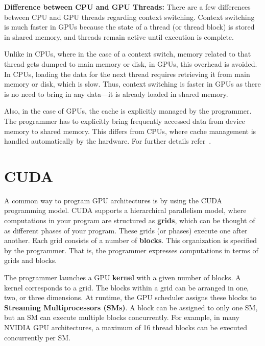 \documentclass[12pt]{book}
\begin{document}
\textbf{Difference between CPU and GPU Threads:} There are a few differences between CPU and GPU threads regarding context switching. Context switching is much faster in GPUs because the state of a thread (or thread block) is stored in shared memory, and threads remain active until execution is complete. 

Unlike in CPUs, where in the case of a context switch, memory related to that thread gets dumped to main memory or disk, in GPUs, this overhead is avoided. In CPUs, loading the data for the next thread requires retrieving it from main memory or disk, which is slow. Thus, context switching is faster in GPUs as there is no need to bring in any data—it is already loaded in shared memory.

Also, in the case of GPUs, the cache is explicitly managed by the programmer. The programmer has to explicitly bring frequently accessed data from device memory to shared memory. This differs from CPUs, where cache management is handled automatically by the hardware. For further details refer~\cite{nvidia2020a100}.

\section{CUDA}
A common way to program GPU architectures is by using the CUDA programming model. CUDA supports a hierarchical parallelism model, where computations in your program are structured as \textbf{grids}, which can be thought of as different phases of your program. These grids (or phases) execute one after another. Each grid consists of a number of \textbf{blocks}. This organization is specified by the programmer. That is, the programmer expresses computations in terms of grids and blocks.

The programmer launches a GPU \textbf{kernel} with a given number of blocks. A kernel corresponds to a grid. The blocks within a grid can be arranged in one, two, or three dimensions. At runtime, the GPU scheduler assigns these blocks to \textbf{Streaming Multiprocessors (SMs)}. A block can be assigned to only one SM, but an SM can execute multiple blocks concurrently. For example, in many NVIDIA GPU architectures, a maximum of 16 thread blocks can be executed concurrently per SM.
\end{document}
